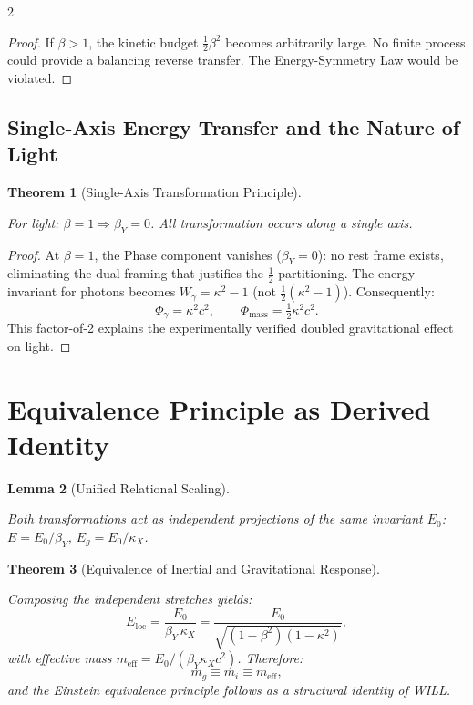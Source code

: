 \documentclass[10pt, a4paper]{article}
\newtheorem{theorem}{Theorem}[section]
\newtheorem{lemma}[theorem]{Lemma}
\begin{document}
\begin{multicols}{2}
\begin{proof}
If $\beta > 1$, the kinetic budget $\frac{1}{2}\beta^2$ becomes arbitrarily large. No finite process could provide a balancing reverse transfer. The Energy-Symmetry Law would be violated.
\end{proof}

\subsection{Single-Axis Energy Transfer and the Nature of Light}
\hypertarget{sec:nature_of_light}{}\label{sec:nature_of_light}

\begin{theorem}[Single-Axis Transformation Principle]
\hypertarget{thm:single-axis}{}\label{thm:single-axis}
For light: $\beta = 1 \Longrightarrow \beta_Y = 0$.
All transformation occurs along a single axis.
\end{theorem}

\begin{proof}
At $\beta=1$, the Phase component vanishes ($\beta_Y=0$): no rest frame exists, eliminating the dual-framing that justifies the $\frac{1}{2}$ partitioning. The energy invariant for photons becomes $W_\gamma = \kappa^2 - 1$ (not $\frac{1}{2}(\kappa^2-1)$). Consequently:
\[
\Phi_\gamma = \kappa^2 c^2, \qquad \Phi_{\text{mass}} = \tfrac{1}{2}\kappa^2 c^2.
\]
This factor-of-2 explains the experimentally verified doubled gravitational effect on light.
\end{proof}



\section{Equivalence Principle as Derived Identity}

\begin{lemma}[Unified Relational Scaling]
\hypertarget{lem:unifiedscaling}{}\label{lem:unifiedscaling}
Both transformations act as independent projections of the same invariant $E_0$:
$E = E_0/\beta_Y$, \quad $E_g = E_0/\kappa_X$.
\end{lemma}

\begin{theorem}[Equivalence of Inertial and Gravitational Response]
\hypertarget{thm:equivalence}{}\label{thm:equivalence}
Composing the independent stretches yields:
\[
E_{\mathrm{loc}} = \frac{E_0}{\beta_Y\,\kappa_X} = \frac{E_0}{\sqrt{(1-\beta^2)(1-\kappa^2)}},
\]
with effective mass $m_{\mathrm{eff}} = E_0/(\beta_Y\kappa_X c^2)$. Therefore:
\[
\boxed{m_g \equiv m_i \equiv m_{\mathrm{eff}}},
\]
and the Einstein equivalence principle follows as a structural identity of WILL.
\end{theorem}


\end{multicols}
\end{document}
